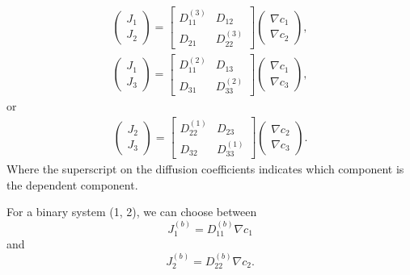 \begin{equation}
    \begin{split}
        \begin{pmatrix}J_1 \\ J_2\end{pmatrix} = \begin{bmatrix}D_{11}^{(3)} & D_{12} \\ D_{21} & D_{22}^{(3)}\end{bmatrix} \begin{pmatrix}\nabla c_1 \\ \nabla c_2\end{pmatrix},
    \end{split}
    \label{eq:tern_dep3}
\end{equation}
\begin{equation}
    \begin{split}
        \begin{pmatrix}J_1 \\ J_3\end{pmatrix} = \begin{bmatrix}D_{11}^{(2)} & D_{13} \\ D_{31} & D_{33}^{(2)}\end{bmatrix} \begin{pmatrix}\nabla c_1 \\ \nabla c_3\end{pmatrix},
    \end{split}
    \label{eq:tern_dep2}
\end{equation}
or
\begin{equation}
    \begin{split}
        \begin{pmatrix}J_2 \\ J_3\end{pmatrix} = \begin{bmatrix}D_{22}^{(1)} & D_{23} \\ D_{32} & D_{33}^{(1)}\end{bmatrix} \begin{pmatrix} \nabla c_2 \\ \nabla c_3\end{pmatrix}.
    \end{split}
    \label{eq:tern_dep1}
\end{equation}
Where the superscript on the diffusion coefficients indicates which component is the dependent component.

For a binary system (1, 2), we can choose between
\begin{equation}
    J_1^{(b)} = D_{11}^{(b)} \nabla c_1
    \label{eq:bin_dep2}
\end{equation}
and
\begin{equation}
    J_2^{(b)} = D_{22}^{(b)} \nabla c_2.
    \label{eq:bin_dep1}
\end{equation}

